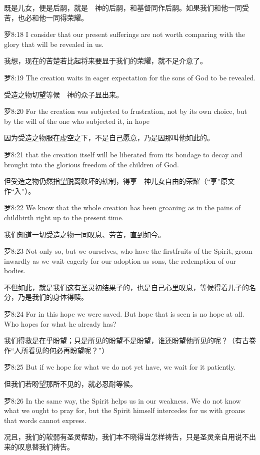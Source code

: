 \documentclass[a4paper,11pt,onecolumn,twoside]{ctexart}
\begin{document}
\begin{multicols}{2}
 既是儿女，便是后嗣，就是　神的后嗣，和基督同作后嗣。如果我们和他一同受苦，也必和他一同得荣耀。


 罗8:18
 I consider that our present sufferings are not worth comparing with the glory that will be revealed in us.

 我想，现在的苦楚若比起将来要显于我们的荣耀，就不足介意了。


 罗8:19
 The creation waits in eager expectation for the sons of God to be revealed.

 受造之物切望等候　神的众子显出来。


 罗8:20
 For the creation was subjected to frustration, not by its own choice, but by the will of the one who subjected it, in hope

 因为受造之物服在虚空之下，不是自己愿意，乃是因那叫他如此的。


 罗8:21
 that the creation itself will be liberated from its bondage to decay and brought into the glorious freedom of the children of God.

 但受造之物仍然指望脱离败坏的辖制，得享　神儿女自由的荣耀（“享”原文作“入”）。


 罗8:22
 We know that the whole creation has been groaning as in the pains of childbirth right up to the present time.

 我们知道一切受造之物一同叹息、劳苦，直到如今。


 罗8:23
 Not only so, but we ourselves, who have the firstfruits of the Spirit, groan inwardly as we wait eagerly for our adoption as sons, the redemption of our bodies.

 不但如此，就是我们这有圣灵初结果子的，也是自己心里叹息，等候得着儿子的名分，乃是我们的身体得赎。


 罗8:24
 For in this hope we were saved. But hope that is seen is no hope at all. Who hopes for what he already has?

 我们得救是在乎盼望；只是所见的盼望不是盼望，谁还盼望他所见的呢？（有古卷作“人所看见的何必再盼望呢？”）


 罗8:25
 But if we hope for what we do not yet have, we wait for it patiently.

 但我们若盼望那所不见的，就必忍耐等候。


 罗8:26
 In the same way, the Spirit helps us in our weakness. We do not know what we ought to pray for, but the Spirit himself intercedes for us with groans that words cannot express.

 况且，我们的软弱有圣灵帮助，我们本不晓得当怎样祷告，只是圣灵亲自用说不出来的叹息替我们祷告。



\end{multicols}
\end{document}

